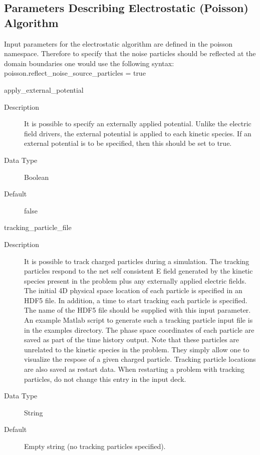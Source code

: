 \documentclass[11pt]{amsart}
\begin{document}
\subsection*{Parameters Describing Electrostatic (Poisson) Algorithm}
Input parameters for the electrostatic algorithm are defined in the poisson
namespace.  Therefore to specify that the noise particles should be reflected
at the domain boundaries one would use the following syntax: \\
poisson.reflect\_noise\_source\_particles = true

apply\_external\_potential
\begin{description}
\item [Description] It is possible to specify an externally applied potential.
Unlike the electric field drivers, the external potential is applied to each
kinetic species.  If an external potential is to be specified, then this should
be set to true.
\item [Data Type] Boolean
\item [Default] false
\end{description}

tracking\_particle\_file
\begin{description}
\item [Description] It is possible to track charged particles during a
simulation.  The tracking particles respond to the net self consistent E field
generated by the kinetic species present in the problem plus any externally
applied electric fields.  The initial 4D physical space location of each
particle is specified in an HDF5 file.  In addition, a time to start tracking
each particle is specified.  The name of the HDF5 file should be supplied with
this input parameter.  An example Matlab script to generate such a tracking
particle input file is in the examples directory.  The phase space coordinates
of each particle are saved as part of the time history output.  Note that these
particles are unrelated to the kinetic species in the problem.  They simply
allow one to visualize the respose of a given charged particle.  Tracking
particle locations are also saved as restart data.  When restarting a problem
with tracking particles, do not change this entry in the input deck.
\item [Data Type] String
\item [Default] Empty string (no tracking particles specified).
\end{description}
\end{document}
